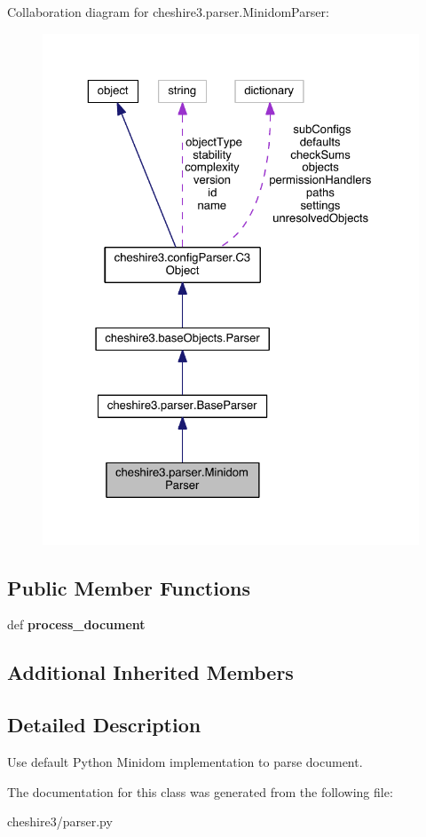 Collaboration diagram for cheshire3.\-parser.\-Minidom\-Parser\-:
\nopagebreak
\begin{figure}[H]
\begin{center}
\leavevmode
\includegraphics[width=325pt]{classcheshire3_1_1parser_1_1_minidom_parser__coll__graph}
\end{center}
\end{figure}
\subsection*{Public Member Functions}
\begin{DoxyCompactItemize}
\item 
\hypertarget{classcheshire3_1_1parser_1_1_minidom_parser_aa03038d09e3133e34a7b7bf12993f0e5}{def {\bfseries process\-\_\-document}}\label{classcheshire3_1_1parser_1_1_minidom_parser_aa03038d09e3133e34a7b7bf12993f0e5}

\end{DoxyCompactItemize}
\subsection*{Additional Inherited Members}


\subsection{Detailed Description}
\begin{DoxyVerb}Use default Python Minidom implementation to parse document.\end{DoxyVerb}
 

The documentation for this class was generated from the following file\-:\begin{DoxyCompactItemize}
\item 
cheshire3/parser.\-py\end{DoxyCompactItemize}
